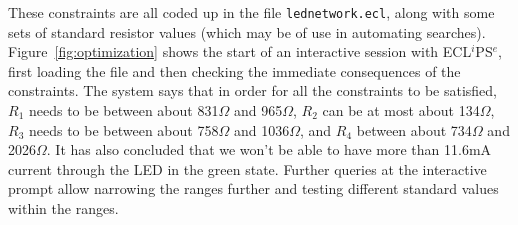 These constraints are all coded up in the file \texttt{lednetwork.ecl},
along with some sets of standard resistor values (which may be of use in
automating searches).  Figure~\ref{fig:optimization} shows the start of an
interactive session with ECL$^i$PS$^e$, first loading the file and then
checking the immediate consequences of the constraints.  The system says
that in order for all the constraints to be satisfied, $R_1$ needs to be
between about 831$\Omega$ and 965$\Omega$, $R_2$ can be at most about
134$\Omega$, $R_3$ needs to be between about 758$\Omega$ and 1036$\Omega$,
and $R_4$ between about 734$\Omega$ and 2026$\Omega$.  It has also concluded
that we won't be able to have more than 11.6mA current through the LED in
the green state.  Further queries at the interactive prompt allow narrowing
the ranges further and testing different standard values within the ranges.

